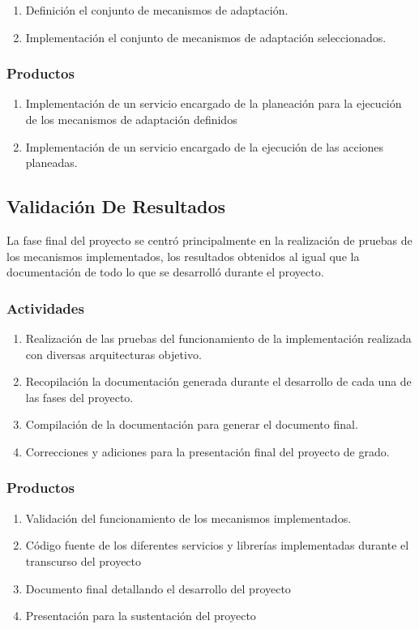 \begin{enumerate}
    \itemsep-2mm
    \item Definición el conjunto de mecanismos de adaptación.
    \item Implementación el conjunto de mecanismos de adaptación seleccionados.
\end{enumerate}  

\subsubsection*{Productos}

\begin{enumerate}
    \itemsep-2mm
    \item Implementación de un servicio encargado de la planeación para la ejecución de los mecanismos de adaptación definidos
    \item Implementación de un servicio encargado de la ejecución de las acciones planeadas.
\end{enumerate}

\subsection{Validación De Resultados}

La fase final del proyecto se centró principalmente en la realización de pruebas de los mecanismos implementados, los resultados obtenidos al igual que la documentación de todo lo que se desarrolló durante el proyecto.

\subsubsection*{Actividades}

\begin{enumerate}
    \itemsep-2mm
    \item Realización de las pruebas del funcionamiento de la implementación realizada con diversas arquitecturas objetivo.
    \item Recopilación la documentación generada durante el desarrollo de cada una de las fases del proyecto.
    \item Compilación de la documentación para generar el documento final.
    \item Correcciones y adiciones para la presentación final del proyecto de grado.
\end{enumerate}  

\subsubsection*{Productos}

\begin{enumerate}
    \itemsep-2mm
    \item Validación del funcionamiento de los mecanismos implementados.
    \item Código fuente de los diferentes servicios y librerías implementadas durante el transcurso del proyecto
    \item Documento final detallando el desarrollo del proyecto
    \item Presentación para la sustentación del proyecto
\end{enumerate}